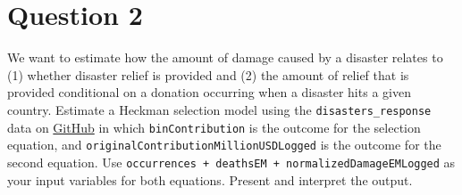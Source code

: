\documentclass[12pt,letterpaper]{article}
\begin{document}
\section*{Question 2}
\vspace{.25cm}
\noindent We want to estimate how the amount of damage caused by a disaster relates to (1) whether disaster relief is provided and (2) the amount of relief that is provided  conditional on a donation occurring when a disaster hits a given country. Estimate a Heckman selection model using the \texttt{disasters\_response} data on \href{https://raw.githubusercontent.com/ASDS-TCD/StatsII_2026/refs/heads/main/datasets/disaster_response.csv}{GitHub} in which \texttt{binContribution} is the outcome for the selection equation, and \texttt{originalContributionMillionUSDLogged} is the outcome for the second equation. Use \texttt{occurrences  + deathsEM + normalizedDamageEMLogged} as your input variables for both equations. Present and interpret the output.
\end{document}
